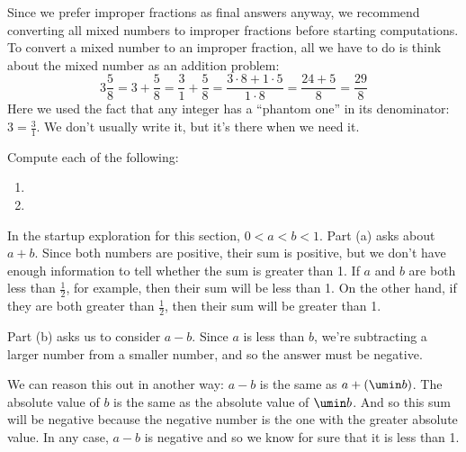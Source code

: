 Since we prefer improper fractions as final answers anyway, we recommend converting all mixed numbers to improper fractions before starting computations. To convert a mixed number to an improper fraction, all we have to do is think about the mixed number as an addition problem:
\[3\frac{5}{8} = 3 + \frac{5}{8} = \frac{3}{1} + \frac{5}{8} = \frac{3 \cdot 8 + 1 \cdot 5}{1 \cdot 8} = \frac{24 + 5}{8} = \frac{29}{8}\]
Here we used the fact that any integer has a ``phantom one'' in its denominator: $3 = \frac{3}{1}$. We don't usually write it, but it's there when we need it.

\begin{boxex}
Compute each of the following:

\begin{enumerate}[itemsep=10pt]
\item {}

\item {}
\end{enumerate}
\end{boxex}

In the startup exploration for this section, $0 < a < b < 1$. Part (a) asks about $a + b$. Since both numbers are positive, their sum is positive, but we don't have enough information to tell whether the sum is greater than 1. If $a$ and $b$ are both less than $\frac{1}{2}$, for example, then their sum will be less than 1. On the other hand, if they are both greater than $\frac{1}{2}$, then their sum will be greater than 1.

Part (b) asks us to consider $a - b$. Since $a$ is less than $b$, we're subtracting a larger number from a smaller number, and so the answer must be negative.

We can reason this out in another way: $a-b$ is the same as $a + (\umin b)$. The absolute value of $b$ is the same as the absolute value of $\umin b$. And so this sum will be negative because the negative number is the one with the greater absolute value. In any case, $a-b$ is negative and so we know for sure that it is less than 1.

